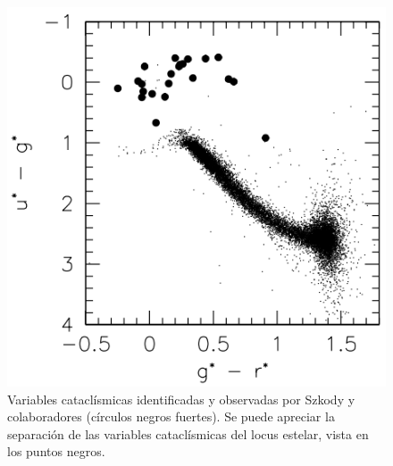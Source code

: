 \begin{figure}[!ht]
	\includegraphics[scale=0.4]{Muestra/Secciones/Figures/ug-gr_Szkody2002.png}

	\caption{Variables cataclísmicas identificadas y observadas por Szkody y
		colaboradores (círculos negros fuertes). Se puede apreciar la separación
		de las variables cataclísmicas del locus estelar, vista en los puntos
		negros. }
	\label{szkody2002ColorColorVCs}
\end{figure}